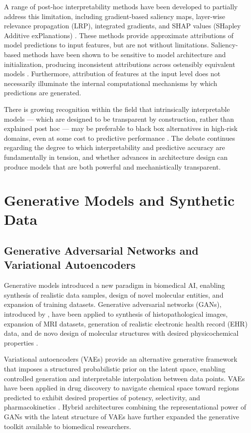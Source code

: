 A range of post-hoc interpretability methods have been developed to partially address this limitation, including gradient-based saliency maps, layer-wise relevance propagation (LRP), integrated gradients, and SHAP values (SHapley Additive exPlanations) \parencite{lundberg2017, sundararajan2017}. These methods provide approximate attributions of model predictions to input features, but are not without limitations. Saliency-based methods have been shown to be sensitive to model architecture and initialization, producing inconsistent attributions across ostensibly equivalent models \parencite{adebayo2018}. Furthermore, attribution of features at the input level does not necessarily illuminate the internal computational mechanisms by which predictions are generated.

There is growing recognition within the field that intrinsically interpretable models --- which are designed to be transparent by construction, rather than explained post hoc --- may be preferable to black box alternatives in high-risk domains, even at some cost to predictive performance \parencite{rudin2019}. The debate continues regarding the degree to which interpretability and predictive accuracy are fundamentally in tension, and whether advances in architecture design can produce models that are both powerful and mechanistically transparent.

\section{Generative Models and Synthetic Data}

\subsection{Generative Adversarial Networks and Variational Autoencoders}

Generative models introduced a new paradigm in biomedical AI, enabling synthesis of realistic data samples, design of novel molecular entities, and expansion of training datasets. Generative adversarial networks (GANs), introduced by \textcite{goodfellow2014}, have been applied to synthesis of histopathological images, expansion of MRI datasets, generation of realistic electronic health record (EHR) data, and de novo design of molecular structures with desired physicochemical properties \parencite{kadurin2017, baowaly2019}.

Variational autoencoders (VAEs) provide an alternative generative framework that imposes a structured probabilistic prior on the latent space, enabling controlled generation and interpretable interpolation between data points. VAEs have been applied in drug discovery to navigate chemical space toward regions predicted to exhibit desired properties of potency, selectivity, and pharmacokinetics \parencite{gomez2018}. Hybrid architectures combining the representational power of GANs with the latent structure of VAEs have further expanded the generative toolkit available to biomedical researchers.

